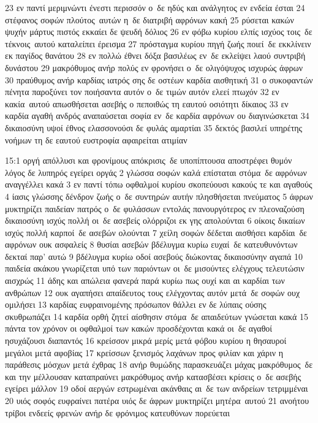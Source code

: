\documentclass[10pt,oneside,footinclude=true,headinclude=true]{scrbook} %
\begin{document}
23 εν παντί μεριμνώντι ένεστι περισσόν ο δε ηδύς και ανάλγητος εν ενδεία έσται
24 στέφανος σοφών πλούτος αυτών η δε διατριβή αφρόνων κακή
25 ρύσεται κακών ψυχήν μάρτυς πιστός εκκαίει δε ψευδή δόλιος
26 εν φόβω κυρίου ελπίς ισχύος τοις δε τέκνοις αυτού καταλείπει έρεισμα
27 πρόσταγμα κυρίου πηγή ζωής ποιεί δε εκκλίνειν εκ παγίδος θανάτου
28 εν πολλώ έθνει δόξα βασιλέως εν δε εκλείψει λαού συντριβή δυνάστου
29 μακρόθυμος ανήρ πολύς εν φρονήσει ο δε ολιγόψυχος ισχυρώς άφρων
30 πραύθυμος ανήρ καρδίας ιατρός σης δε οστέων καρδία αισθητική
31 ο συκοφαντών πένητα παροξύνει τον ποιήσαντα αυτόν ο δε τιμών αυτόν ελεεί πτωχόν
32 εν κακία αυτού απωσθήσεται ασεβής ο πεποιθώς τη εαυτού οσιότητι δίκαιος
33 εν καρδία αγαθή ανδρός αναπαύσεται σοφία εν δε καρδία αφρόνων ου διαγινώσκεται
34 δικαιοσύνη υψοί έθνος ελασσονούσι δε φυλάς αμαρτίαι
35 δεκτός βασιλεί υπηρέτης νοήμων τη δε εαυτού ευστροφία αφαιρείται ατιμίαν
\par
15:1 οργή απόλλυσι και φρονίμους απόκρισις δε υποπίπτουσα αποστρέφει θυμόν λόγος δε λυπηρός εγείρει οργάς
2 γλώσσα σοφών καλά επίσταται στόμα δε αφρόνων αναγγέλλει κακά
3 εν παντί τόπω οφθαλμοί κυρίου σκοπεύουσι κακούς τε και αγαθούς
4 ίασις γλώσσης δένδρον ζωής ο δε συντηρών αυτήν πλησθήσεται πνεύματος
5 άφρων μυκτηρίζει παιδείαν πατρός ο δε φυλάσσων εντολάς πανουργότερος εν πλεοναζούση δικαιοσύνη ισχύς πολλή οι δε ασεβείς ολόρριζοι εκ γης απολούνται
6 οίκοις δικαίων ισχύς πολλή καρποί δε ασεβών ολούνται
7 χείλη σοφών δέδεται αισθήσει καρδίαι δε αφρόνων ουκ ασφαλείς
8 θυσίαι ασεβών βδέλυγμα κυρίω ευχαί δε κατευθυνόντων δεκταί παρ' αυτώ
9 βδέλυγμα κυρίω οδοί ασεβούς διώκοντας δικαιοσύνην αγαπά
10 παιδεία ακάκου γνωρίζεται υπό των παριόντων οι δε μισούντες ελέγχους τελευτώσιν αισχρώς
11 άδης και απώλεια φανερά παρά κυρίω πως ουχί και αι καρδίαι των ανθρώπων
12 ουκ αγαπήσει απαίδευτος τους ελέγχοντας αυτόν μετά δε σοφών ουχ ομιλήσει
13 καρδίας ευφραινομένης πρόσωπον θάλλει εν δε λύπαις ούσης σκυθρωπάζει
14 καρδία ορθή ζητεί αίσθησιν στόμα δε απαιδεύτων γνώσεται κακά
15 πάντα τον χρόνον οι οφθαλμοί των κακών προσδέχονται κακά οι δε αγαθοί ησυχάζουσι διαπαντός
16 κρείσσον μικρά μερίς μετά φόβου κυρίου η θησαυροί μεγάλοι μετά αφοβίας
17 κρείσσων ξενισμός λαχάνων προς φιλίαν και χάριν η παράθεσις μόσχων μετά έχθρας
18 ανήρ θυμώδης παρασκευάζει μάχας μακρόθυμος δε και την μέλλουσαν καταπραύνει μακρόθυμος ανήρ κατασβέσει κρίσεις ο δε ασεβής εγείρει μάλλον
19 οδοί αεργών εστρωμέναι ακάνθαις αι δε των ανδρείων τετριμμέναι
20 υιός σοφός ευφραίνει πατέρα υιός δε άφρων μυκτηρίζει μητέρα αυτού
21 ανοήτου τρίβοι ενδεείς φρενών ανήρ δε φρόνιμος κατευθύνων πορεύεται
\end{document}
